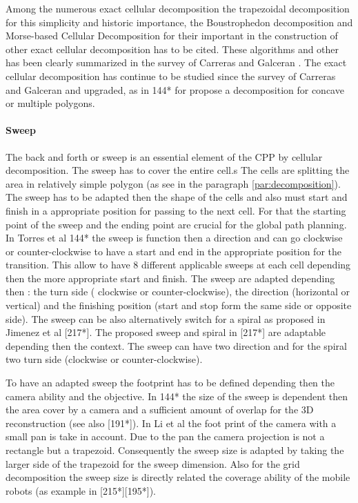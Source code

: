 \begin{itemize}
	Among the numerous exact cellular decomposition the trapezoidal decomposition for this simplicity and historic importance, the Boustrophedon decomposition  and  Morse-based Cellular Decomposition for their important in the construction of other exact cellular decomposition has to be cited. These algorithms and other has been clearly summarized in the survey of Carreras and Galceran \citep{66*galceran2013}. 
	The exact cellular decomposition has continue to be studied since the survey of  Carreras and Galceran  \citep{66*galceran2013} and upgraded, as in 144* for propose a decomposition for concave or multiple polygons.
	
\end{itemize}




% 

 
 \paragraph*{Sweep} \label{par:sweep}
	The back and forth or sweep is an essential element of the CPP by cellular decomposition. The sweep has to cover the entire cell.s The cells are splitting the area in relatively simple polygon (as see in the paragraph \ref{par:decomposition}). The sweep has to be adapted then the shape of the cells and also must start and finish in a appropriate position for passing to the next cell.
	For that the starting point of the sweep and the ending point are crucial for the global path planning.
	In Torres et al 144* the sweep is function then a direction and can go clockwise or counter-clockwise to have a start and end in the appropriate position for the transition. 
	 This allow to have 8 different  applicable sweeps at each cell depending then the more appropriate start and finish. The sweep  are adapted depending then : the turn side ( clockwise or counter-clockwise), the direction (horizontal or vertical) and the finishing  position (start and stop form the same side or opposite side).  
	 The sweep can be also alternatively switch for a spiral as proposed in Jimenez et al [217*]. The proposed sweep and spiral in [217*] are adaptable depending then the context. The sweep can have two direction and for the spiral two turn side (clockwise or counter-clockwise).
	 
	To have an adapted sweep the footprint has to be defined depending then the camera ability and the objective. In 144* the size of the sweep is dependent then the area cover by a camera and a sufficient amount of overlap for the 3D reconstruction (see also [191*]). In Li et al  \citep{146*li2011} the foot print of the camera with a small pan is take in account. Due to the pan the camera projection is not a rectangle but a trapezoid. Consequently the sweep size is adapted by taking the larger side of the trapezoid for the sweep dimension.
	Also for the grid decomposition the sweep size is directly related the coverage ability of the mobile robots (as example in [215*][195*]).  %
	
